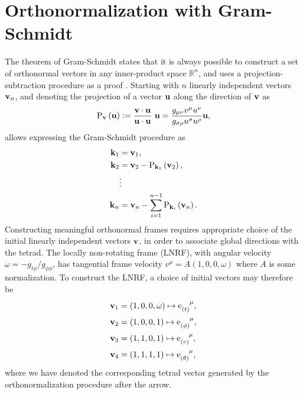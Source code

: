 \section{Orthonormalization with Gram-Schmidt}
\label{appendix:gram-schmidt}

The theorem of Gram-Schmidt states that it is always possible to construct a set of orthonormal vectors in any inner-product space $\mathbb{R}^n$, and uses a projection-subtraction procedure as a proof \citep{schmidt_uber_1989}. Starting with $n$ linearly independent vectors $\mathbf{v}_n$, and denoting the projection of a vector $\mathbf{u}$ along the direction of $\mathbf{v}$ as
\begin{equation}
\mathrm{P}_{\vector{v}}\left(\vector{u}\right) := \frac{\vector{v} \cdot \vector{u}}{\vector{u} \cdot \vector{u}}\ \vector{u} = \frac{g_{\mu\nu} v^\mu u^\nu}{g_{\sigma\rho} u^\sigma u^\rho} \vector{u},
\end{equation}
allows expressing the Gram-Schmidt procedure as
\begin{align}
    \mathbf{k}_1 &= \mathbf{v}_1, \nonumber \\
    \mathbf{k}_2 &= \mathbf{v}_2 - \mathrm{P}_{\mathbf{k}_1}\left(\mathbf{v}_2 \right), \nonumber \\
    &\vdots \nonumber \\
    \mathbf{k}_n &= \mathbf{v}_n - \sum_{i = 1}^{n-1} \mathrm{P}_{\mathbf{k}_i} \left(\mathbf{v}_n \right).
\end{align}
Constructing meaningful orthonormal frames requires appropriate choice of the initial linearly independent vectors $\mathbf{v}$, in order to associate global directions with the tetrad. The locally non-rotating frame (LNRF), with angular velocity $\omega = -g_{t\phi} / g_{\phi\phi}$, has tangential frame velocity $v^\mu = A (1, 0, 0, \omega)$ where $A$ is some normalization. To construct the LNRF, a choice of initial vectors may therefore be
\begin{align}
    \vector{v}_1 &= \left(1, 0, 0, \omega \right) \mapsto \dtensor{\e}{(t)}{\mu}, \nonumber \\
    \vector{v}_2 &= \left(1, 0, 0, 1\right) \mapsto \dtensor{\e}{(\phi)}{\mu}, \nonumber \\
    \vector{v}_3 &= \left(1, 1, 0, 1\right) \mapsto \dtensor{\e}{(r)}{\mu}, \nonumber \\
    \vector{v}_4 &= \left(1, 1, 1, 1\right) \mapsto \dtensor{\e}{(\theta)}{\mu},
\end{align}
where we have denoted the corresponding tetrad vector generated by the orthonormalization procedure after the arrow.

